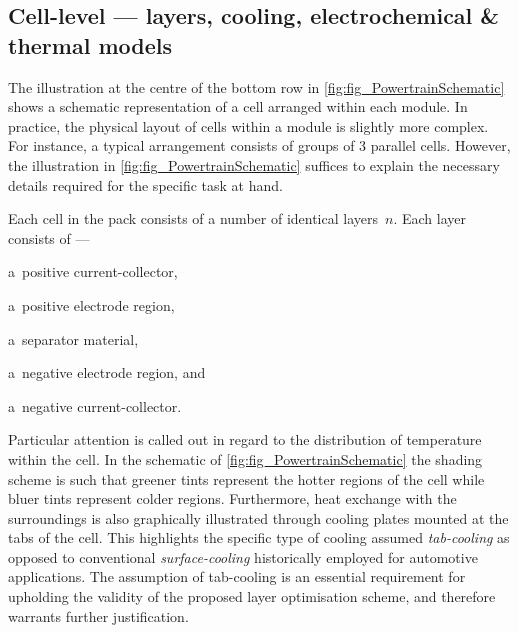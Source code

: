 
\subsection{Cell-level --- layers, cooling, electrochemical \& thermal models}\label{sec:celllevelxeVinfo}

The    illustration    at     the    centre    of    the     bottom    row    in
\cref{fig:fig_PowertrainSchematic} shows  a schematic  representation of  a cell
arranged within  each module. In practice,  the physical layout of  cells within
a  module  is  slightly  more  complex.  For  instance,  a  typical  arrangement
consists  of  groups   of  3  parallel  cells.  However,   the  illustration  in
\cref{fig:fig_PowertrainSchematic}  suffices to  explain  the necessary  details
required for the specific task at hand.

Each cell in the pack consists of a number of identical layers~$n$. Each layer
consists of ---
\begin{enumerate*}[label=\roman*)]
    \item a~positive current-collector,
    \item a~positive electrode region,
    \item a~separator material,
    \item a~negative electrode region, and
    \item a~negative current-collector.
\end{enumerate*}
Particular attention is called out in  regard to the distribution of temperature
within  the cell.  In  the schematic  of \cref{fig:fig_PowertrainSchematic}  the
shading scheme  is such that greener  tints represent the hotter  regions of the
cell while bluer tints represent colder regions. Furthermore, heat exchange with
the surroundings is also graphically  illustrated through cooling plates mounted
at the tabs  of the cell. This  highlights the specific type  of cooling assumed
\viz{}  \emph{tab-cooling}  as  opposed to  conventional  \emph{surface-cooling}
historically employed for automotive applications. The assumption of tab-cooling
is an  essential requirement for  upholding the  validity of the  proposed layer
optimisation scheme, and therefore warrants further justification.

